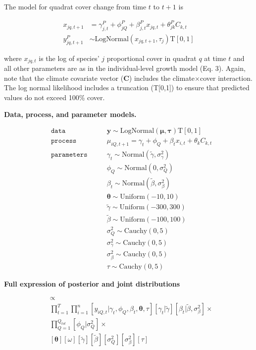 \documentclass[12pt,]{article}
\begin{document}
The model for quadrat cover change from time $t$ to $t+1$ is

\begin{align}
x_{jq,t+1} &= \gamma^{P}_{j,t} + \phi^{P}_{jQ} + \beta^{P}_{j,t}x_{jq,t} + \theta^{P}_{jk}C_{k,t} \\
y^{P}_{jq,t+1} &\sim \text{LogNormal}(x_{jq,t+1}, \tau_{j}) \text{T}[0,1]
\end{align}

where $x_{jq,t}$ is the log of species' $j$ proportional cover in
quadrat $q$ at time $t$ and all other parameters are as in the
individual-level growth model (Eq. 3). Again, note that the climate
covariate vector (\textbf{C}) includes the climate$\times$cover
interaction. The log normal likelihood includes a truncation
(T{[}0,1{]}) to ensure that predicted values do not exceed 100\% cover.

\textbf{Data, process, and parameter models.}

\begin{align}
&\mathtt{data} \qquad &\textbf{y} \sim \text{LogNormal}(\boldsymbol{\mu}, \boldsymbol{\tau}) \text{T}[0,1] \\
&\mathtt{process} \qquad &\mu_{iQ,t+1} = \gamma_{t} + \phi_{Q} + \beta_{t}x_{i,t} + \theta_{k}C_{k,t} \\
&\mathtt{parameters} \qquad &\gamma_{t} \sim \text{Normal}(\tilde{\gamma}, \sigma_\gamma^2)\\
& \qquad & \phi_{Q} \sim \text{Normal}(0,\sigma_Q^2) \\
& \qquad & \beta_{t} \sim \text{Normal}(\tilde{\beta}, \sigma_\beta^2) \\
& \qquad & \boldsymbol{\theta} \sim \text{Uniform}(-10, 10) \\
& \qquad & \tilde{\gamma} \sim \text{Uniform}(-300, 300) \\
& \qquad & \tilde{\beta} \sim \text{Uniform}(-100, 100) \\
& \qquad & \sigma_Q^2 \sim \text{Cauchy}(0, 5) \\
& \qquad & \sigma_\gamma^2 \sim \text{Cauchy}(0, 5) \\
& \qquad & \sigma_\beta^2 \sim \text{Cauchy}(0, 5) \\
& \qquad & \tau \sim \text{Cauchy}(0, 5)
\end{align}

\textbf{Full expression of posterior and joint distributions}

\begin{align}
[\boldsymbol{\gamma}, \tilde{\gamma}, \boldsymbol{\phi}, \boldsymbol{\beta}, \tilde{\beta}, \boldsymbol{\theta}, \sigma_Q^2, \sigma_\beta^2, \tau] &\propto \\
&\prod_{t=1}^T \prod_{i=1}^n [y_{iQ,t} | \gamma_{t}, \phi_{Q}, \beta_{t}, \boldsymbol{\theta}, \tau] [\gamma_{t} | \tilde{\gamma}] [\beta_{t} | \tilde{\beta}, \sigma_\beta^2] \times \\
&\prod_{Q=1}^{Q_{tot}} [\phi_{Q} | \sigma_Q^2] \times \\
&[\boldsymbol{\theta}] [\omega] [\tilde{\gamma}] [\tilde{\beta}] [\sigma_Q^2] [\sigma_\beta^2] [\tau]
\end{align}
\end{document}
